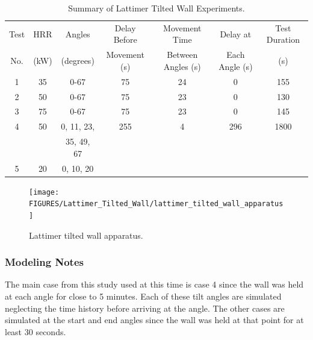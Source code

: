\begin{table}[!htb]
\caption[Summary of JH/FRA Rail Car Experiments]{Summary of Lattimer Tilted Wall Experiments.}
\begin{center}
\begin{tabular}{|c|c|c|c|c|c|c|}
\hline
Test & HRR  & Angles    & Delay Before & Movement Time      & Delay at         & Test Duration \\
No.  & (kW) & (degrees) & Movement (s) & Between Angles (s) & Each Angle (s)   & (s)           \\ \hline \hline
1    & 35   & 0-67      & 75                    & 24                           & 0                   & 155           \\ \hline
2    & 50   & 0-67      & 75                    & 23                           & 0                   & 130           \\ \hline
3    & 75   & 0-67      & 75                    & 23                           & 0                   & 145           \\ \hline
4    & 50   & 0, 11, 23,  & 255                 & 4                            & 296                 & 1800          \\
     &      & 35, 49, 67  &                     &                              &                     &               \\ \hline
5    & 20   & 0, 10, 20 &                       &                              &                     &               \\ \hline
\end{tabular}
\end{center}
\label{Lattimer_Tilted_Wall_tab}
\end{table}

\begin{figure}[h!]
\texttt{[image: FIGURES/Lattimer\_Tilted\_Wall/lattimer\_tilted\_wall\_apparatus]}
\caption[Lattimer tilted wall apparatus]{Lattimer tilted wall apparatus.}
\label{Lattimer_Tilted_Wall_fig}
\end{figure}

\subsubsection{Modeling Notes}

The main case from this study used at this time is case 4 since the wall was held at each angle for close to 5 minutes.
Each of these tilt angles are simulated neglecting the time history before arriving at the angle.
The other cases are simulated at the start and end angles since the wall was held at that point for at least 30 seconds.


